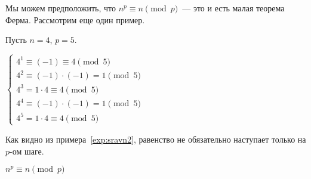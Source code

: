 \documentclass[russian]{lecture-notes}
\begin{document}
\noindent Мы можем предположить, что $n^p \equiv n \pmod p$~--- это и есть малая теорема Ферма. Рассмотрим еще один пример.

\begin{example*}
	Пусть $n=4$, $p=5$.
	
	$\begin{cases}
	4^1 \equiv (-1) \equiv 4 \pmod 5
	\\
	4^2 \equiv (-1) \cdot (-1) = 1 \pmod 5
	\\
	4^3 = 1 \cdot 4 \equiv 4 \pmod 5
	\\
	4^4 \equiv (-1) \cdot (-1) = 1 \pmod 5
	\\
	4^5 = 1 \cdot 4 \equiv 4 \pmod 5
	\end{cases}$
	\label{exp:sravn2}
\end{example*}

\begin{note}
	Как видно из примера~\ref{exp:sravn2}, равенство не обязательно наступает только на $p$-ом шаге.
\end{note}

\begin{theorem}
	$n^p \equiv n \pmod p$
\end{theorem}
\end{document}
